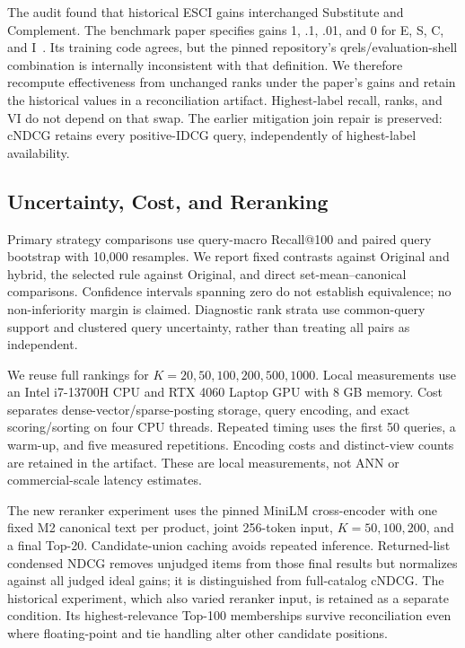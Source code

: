 The audit found that historical ESCI gains interchanged Substitute and Complement. The benchmark paper specifies gains 1, .1, .01, and 0 for E, S, C, and I~\cite{reddy2022shopping}. Its training code agrees, but the pinned repository's qrels/evaluation-shell combination is internally inconsistent with that definition. We therefore recompute effectiveness from unchanged ranks under the paper's gains and retain the historical values in a reconciliation artifact. Highest-label recall, ranks, and VI do not depend on that swap. The earlier mitigation join repair is preserved: cNDCG retains every positive-IDCG query, independently of highest-label availability.

\subsection{Uncertainty, Cost, and Reranking}
Primary strategy comparisons use query-macro Recall@100 and paired query bootstrap with 10,000 resamples. We report fixed contrasts against Original and hybrid, the selected rule against Original, and direct set-mean--canonical comparisons. Confidence intervals spanning zero do not establish equivalence; no non-inferiority margin is claimed. Diagnostic rank strata use common-query support and clustered query uncertainty, rather than treating all pairs as independent.

We reuse full rankings for $K=20,50,100,200,500,1000$. Local measurements use an Intel i7-13700H CPU and RTX 4060 Laptop GPU with 8 GB memory. Cost separates dense-vector/sparse-posting storage, query encoding, and exact scoring/sorting on four CPU threads. Repeated timing uses the first 50 queries, a warm-up, and five measured repetitions. Encoding costs and distinct-view counts are retained in the artifact. These are local measurements, not ANN or commercial-scale latency estimates.

The new reranker experiment uses the pinned MiniLM cross-encoder with one fixed M2 canonical text per product, joint 256-token input, $K=50,100,200$, and a final Top-20. Candidate-union caching avoids repeated inference. Returned-list condensed NDCG removes unjudged items from those final results but normalizes against all judged ideal gains; it is distinguished from full-catalog cNDCG. The historical experiment, which also varied reranker input, is retained as a separate condition. Its highest-relevance Top-100 memberships survive reconciliation even where floating-point and tie handling alter other candidate positions.

